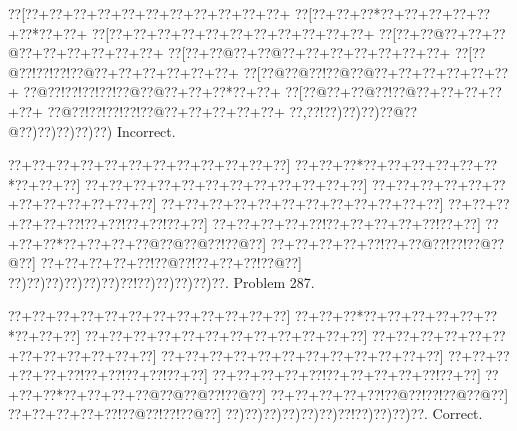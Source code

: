 \documentclass[a5paper]{article}
\begin{document}
\begin{center}
{\goo
\0??[\0??+\0??+\0??+\0??+\0??+\0??+\0??+\0??+\0??+\0??+\0??+
\0??[\0??+\0??+\0??*\0??+\0??+\0??+\0??+\0??+\0??*\0??+\0??+
\0??[\0??+\0??+\0??+\0??+\0??+\0??+\0??+\0??+\0??+\0??+\0??+
\0??[\0??+\0??@\0??+\0??+\0??@\0??+\0??+\0??+\0??+\0??+\0??+
\0??[\0??+\0??@\0??+\0??@\0??+\0??+\0??+\0??+\0??+\0??+\0??+
\0??[\0??@\0??!\0??!\0??!\0??@\0??+\0??+\0??+\0??+\0??+\0??+
\0??[\0??@\0??@\0??!\0??@\0??@\0??+\0??+\0??+\0??+\0??+\0??+
\0??@\0??!\0??!\0??!\0??!\0??@\0??@\0??+\0??+\0??*\0??+\0??+
\0??[\0??@\0??+\0??@\0??!\0??@\0??+\0??+\0??+\0??+\0??+
\0??@\0??!\0??!\0??!\0??!\0??@\0??+\0??+\0??+\0??+\0??+
\0??,\0??!\0??)\0??)\0??)\0??@\0??@\0??)\0??)\0??)\0??)\0??)
}
Incorrect. 

\end{center}
\newpage
\begin{center}
{\goo
\0??+\0??+\0??+\0??+\0??+\0??+\0??+\0??+\0??+\0??+\0??+\0??]
\0??+\0??+\0??*\0??+\0??+\0??+\0??+\0??+\0??*\0??+\0??+\0??]
\0??+\0??+\0??+\0??+\0??+\0??+\0??+\0??+\0??+\0??+\0??+\0??]
\0??+\0??+\0??+\0??+\0??+\0??+\0??+\0??+\0??+\0??+\0??+\0??]
\0??+\0??+\0??+\0??+\0??+\0??+\0??+\0??+\0??+\0??+\0??+\0??]
\0??+\0??+\0??+\0??+\0??+\0??!\0??+\0??!\0??+\0??!\0??+\0??]
\0??+\0??+\0??+\0??+\0??!\0??+\0??+\0??+\0??+\0??!\0??+\0??]
\0??+\0??+\0??*\0??+\0??+\0??+\0??@\0??@\0??@\0??!\0??@\0??]
\0??+\0??+\0??+\0??+\0??!\0??+\0??@\0??!\0??!\0??@\0??@\0??]
\0??+\0??+\0??+\0??+\0??!\0??@\0??!\0??+\0??+\0??!\0??@\0??]
\0??)\0??)\0??)\0??)\0??)\0??)\0??!\0??)\0??)\0??)\0??)\0??.
}
Problem 287.

\end{center}
\begin{center}
{\goo
\0??+\0??+\0??+\0??+\0??+\0??+\0??+\0??+\0??+\0??+\0??+\0??]
\0??+\0??+\0??*\0??+\0??+\0??+\0??+\0??+\0??*\0??+\0??+\0??]
\0??+\0??+\0??+\0??+\0??+\0??+\0??+\0??+\0??+\0??+\0??+\0??]
\0??+\0??+\0??+\0??+\0??+\0??+\0??+\0??+\0??+\0??+\0??+\0??]
\0??+\0??+\0??+\0??+\0??+\0??+\0??+\0??+\0??+\0??+\0??+\0??]
\0??+\0??+\0??+\0??+\0??+\0??!\0??+\0??!\0??+\0??!\0??+\0??]
\0??+\0??+\0??+\0??+\0??!\0??+\0??+\0??+\0??+\0??!\0??+\0??]
\0??+\0??+\0??*\0??+\0??+\0??+\0??@\0??@\0??@\0??!\0??@\0??]
\0??+\0??+\0??+\0??+\0??!\0??@\0??!\0??!\0??@\0??@\0??]
\0??+\0??+\0??+\0??+\0??!\0??@\0??!\0??!\0??@\0??]
\0??)\0??)\0??)\0??)\0??)\0??)\0??!\0??)\0??)\0??)\0??.
}
Correct. 

\end{center}
\end{document}
